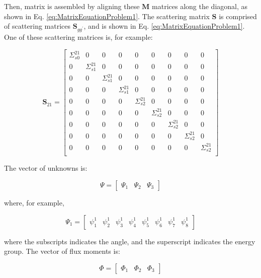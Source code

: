 \documentclass[10pt]{article}
\newcommand*\circled[1]{\tikz[baseline=(char.base)]{
            \node[shape=circle,draw,inner sep=2pt] (char) {#1};}}
\begin{document}
Then, matrix \circled{3} is assembled by aligning these \(\textbf{M}\) matrices along the diagonal, as shown in Eq. \eqref{eq:MatrixEquationProblem1}. The scattering matrix \(\textbf{S}\) is comprised of scattering matrices \(\textbf{S}_{gg^{'}}\), and is shown in Eq. \eqref{eq:MatrixEquationProblem1}. One of these scattering matrices is, for example:

\begin{equation}
\textbf{S}_{21}=\begin{bmatrix}
\Sigma_{s0}^{21} & 0 & 0 & 0 & 0 & 0 & 0 & 0 & 0\\
0& \Sigma_{s1}^{21}  & 0 & 0 & 0 & 0 & 0 & 0 & 0\\
0& 0 & \Sigma_{s1}^{21}  & 0 & 0 & 0 & 0 & 0 & 0\\
0& 0 & 0 & \Sigma_{s1}^{21}  & 0 & 0 & 0 & 0 & 0\\
0& 0 & 0 & 0 & \Sigma_{s2}^{21}  & 0 & 0 & 0 & 0\\
0& 0 & 0 & 0 & 0 & \Sigma_{s2}^{21}  & 0 & 0 & 0\\
0& 0 & 0 & 0 & 0 & 0 & \Sigma_{s2}^{21}  & 0 & 0\\
0& 0 & 0 & 0 & 0 & 0 & 0 & \Sigma_{s2}^{21} & 0\\
0& 0 & 0 & 0 & 0 & 0 & 0 & 0 & \Sigma_{s2}^{21}\\
\end{bmatrix}
\end{equation}

The vector of unknowns is:

\begin{equation}
\Psi=\begin{bmatrix}\Psi_1 & \Psi_2 & \Psi_3\end{bmatrix}
\end{equation}

where, for example, 

\begin{equation}
\Psi_1=\begin{bmatrix}\psi_1^1 & \psi_2^1 & \psi_3^1 & \psi_4^1 & \psi_5^1 & \psi_6^1 & \psi_7^1 & \psi_8^1
\end{bmatrix}
\end{equation}

where the subscripts indicates the angle, and the superscript indicates the energy group. The vector of flux moments is:

\begin{equation}
\Phi=\begin{bmatrix}\Phi_1 & \Phi_2 & \Phi_3\end{bmatrix}
\end{equation}
\end{document}
